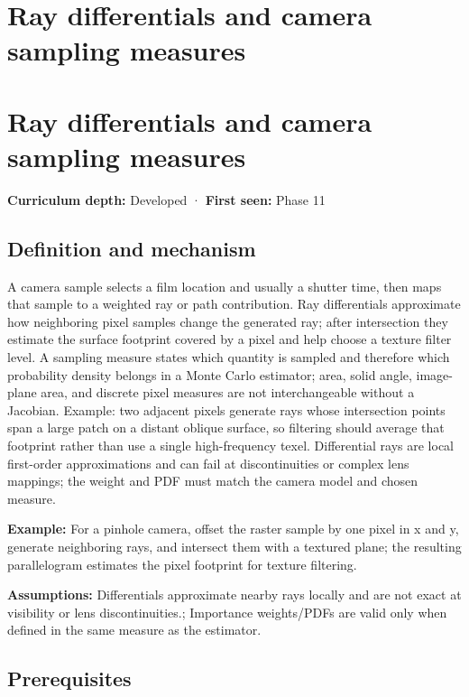 \hypertarget{appendix-8c40fad29462}{}
\section*{Ray differentials and camera sampling measures}
\section{Ray differentials and camera sampling measures}\label{ray-differentials-and-camera-sampling-measures}

\textbf{Curriculum depth:} Developed · \textbf{First seen:} Phase 11

\subsection{Definition and mechanism}\label{definition-and-mechanism}

A camera sample selects a film location and usually a shutter time, then maps that sample to a weighted ray or path contribution. Ray differentials approximate how neighboring pixel samples change the generated ray; after intersection they estimate the surface footprint covered by a pixel and help choose a texture filter level. A sampling measure states which quantity is sampled and therefore which probability density belongs in a Monte Carlo estimator; area, solid angle, image-plane area, and discrete pixel measures are not interchangeable without a Jacobian. Example: two adjacent pixels generate rays whose intersection points span a large patch on a distant oblique surface, so filtering should average that footprint rather than use a single high-frequency texel. Differential rays are local first-order approximations and can fail at discontinuities or complex lens mappings; the weight and PDF must match the camera model and chosen measure.

\textbf{Example:} For a pinhole camera, offset the raster sample by one pixel in x and y, generate neighboring rays, and intersect them with a textured plane; the resulting parallelogram estimates the pixel footprint for texture filtering.

\textbf{Assumptions:} Differentials approximate nearby rays locally and are not exact at visibility or lens discontinuities.; Importance weights/PDFs are valid only when defined in the same measure as the estimator.

\subsection{Prerequisites}\label{prerequisites}

